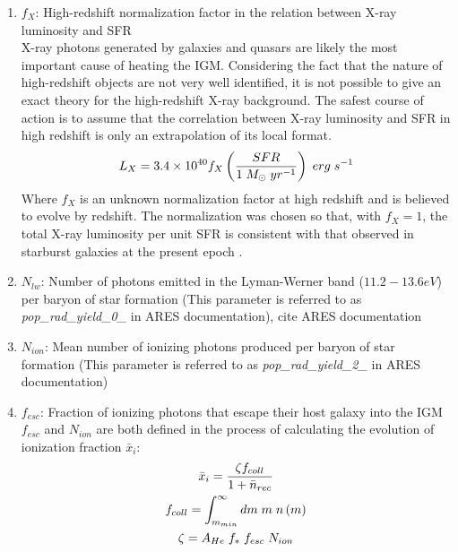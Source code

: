 \documentclass[12pt, TexShade, letterpaper]{report}
\begin{document}
\begin{enumerate}
    \item \textbf{$f_X$}: High-redshift normalization factor in the relation between X-ray luminosity and SFR\\
    X-ray photons generated by galaxies and quasars are likely the most important cause of heating the IGM. Considering the fact that the nature of high-redshift objects are not very well identified, it is not possible to give an exact theory for the high-redshift X-ray background. The safest course of action is to assume that the correlation between X-ray luminosity and SFR in high redshift is only an extrapolation of its local format.
    \begin{equation}
        L_X = 3.4 \times 10^{40} f_X \left( \frac{SFR}{1 \hspace{0.1cm} M_{\odot} \hspace{0.1cm} yr^{-1}}\right) \hspace{0.1cm} erg \hspace{0.1cm}s^{-1}
    \end{equation}
    Where $f_X$ is an unknown normalization factor at high redshift and is believed to evolve by redshift. The normalization was chosen so that, with $f_X =1$, the total X-ray luminosity per unit SFR is consistent with that observed in starburst galaxies at the present epoch \cite{low_frequency, 21century}.
    
    \item \textbf{$N_{lw}$}: Number of photons emitted in the Lyman-Werner band ($11.2-13.6eV$) per baryon of star formation (This parameter is referred to as \emph{pop\_rad\_yield\_0\_} in ARES documentation), cite ARES documentation
    
    \item \textbf{$N_{ion}$}: Mean number of ionizing photons produced per baryon of star formation (This parameter is referred to as \emph{pop\_rad\_yield\_2\_} in ARES documentation)
    
    \item \textbf{$f_{esc}$}: Fraction of ionizing photons that escape their host galaxy into the IGM\\
    $f_{esc}$ and $N_{ion}$ are both defined in the process of calculating the evolution of ionization fraction $\bar{x}_i$:
    \begin{gather}
        \bar{x}_i = \frac{\zeta f_{coll}}{1 + \bar{n}_{rec}}\\
        f_{coll} = \int_{m_{min}}^\infty dm \hspace{0.1cm} m \hspace{0.1cm} n\left(m\right)\\
        \zeta = A_{He} \hspace{0.1cm} f_* \hspace{0.1cm} f_{esc} \hspace{0.1cm} N_{ion}
    \end{gather}
    

\end{enumerate}
\end{document}
